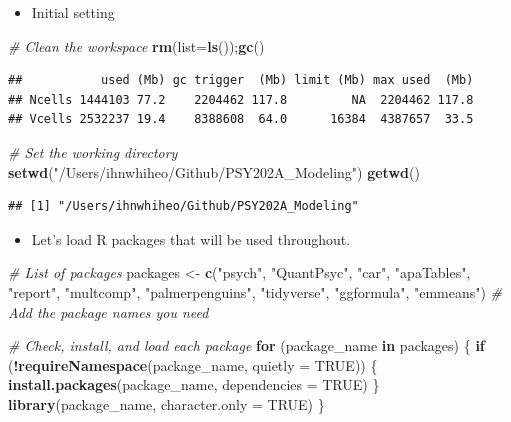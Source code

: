 \documentclass[
]{book}
\newenvironment{Shaded}{\begin{snugshade}}{\end{snugshade}}
\newcommand{\AttributeTok}[1]{\textcolor[rgb]{0.13,0.29,0.53}{#1}}
\newcommand{\CommentTok}[1]{\textcolor[rgb]{0.56,0.35,0.01}{\textit{#1}}}
\newcommand{\ConstantTok}[1]{\textcolor[rgb]{0.56,0.35,0.01}{#1}}
\newcommand{\ControlFlowTok}[1]{\textcolor[rgb]{0.13,0.29,0.53}{\textbf{#1}}}
\newcommand{\FunctionTok}[1]{\textcolor[rgb]{0.13,0.29,0.53}{\textbf{#1}}}
\newcommand{\NormalTok}[1]{#1}
\newcommand{\OtherTok}[1]{\textcolor[rgb]{0.56,0.35,0.01}{#1}}
\newcommand{\SpecialCharTok}[1]{\textcolor[rgb]{0.81,0.36,0.00}{\textbf{#1}}}
\newcommand{\StringTok}[1]{\textcolor[rgb]{0.31,0.60,0.02}{#1}}
\providecommand{\tightlist}{%
  \setlength{\itemsep}{0pt}\setlength{\parskip}{0pt}}
\begin{document}
\begin{itemize}
\tightlist
\item
  Initial setting
\end{itemize}

\begin{Shaded}
\begin{Highlighting}[]
\CommentTok{\# Clean the workspace}
\FunctionTok{rm}\NormalTok{(}\AttributeTok{list=}\FunctionTok{ls}\NormalTok{());}\FunctionTok{gc}\NormalTok{()}
\end{Highlighting}
\end{Shaded}

\begin{verbatim}
##           used (Mb) gc trigger  (Mb) limit (Mb) max used  (Mb)
## Ncells 1444103 77.2    2204462 117.8         NA  2204462 117.8
## Vcells 2532237 19.4    8388608  64.0      16384  4387657  33.5
\end{verbatim}

\begin{Shaded}
\begin{Highlighting}[]
\CommentTok{\# Set the working directory}
\FunctionTok{setwd}\NormalTok{(}\StringTok{"/Users/ihnwhiheo/Github/PSY202A\_Modeling"}\NormalTok{)}
\FunctionTok{getwd}\NormalTok{()}
\end{Highlighting}
\end{Shaded}

\begin{verbatim}
## [1] "/Users/ihnwhiheo/Github/PSY202A_Modeling"
\end{verbatim}

\begin{itemize}
\tightlist
\item
  Let's load R packages that will be used throughout.
\end{itemize}

\begin{Shaded}
\begin{Highlighting}[]
\CommentTok{\# List of packages}
\NormalTok{packages }\OtherTok{\textless{}{-}} \FunctionTok{c}\NormalTok{(}\StringTok{"psych"}\NormalTok{, }\StringTok{"QuantPsyc"}\NormalTok{, }\StringTok{"car"}\NormalTok{, }\StringTok{"apaTables"}\NormalTok{, }\StringTok{"report"}\NormalTok{, }\StringTok{"multcomp"}\NormalTok{,}
              \StringTok{"palmerpenguins"}\NormalTok{, }\StringTok{"tidyverse"}\NormalTok{, }\StringTok{"ggformula"}\NormalTok{, }\StringTok{"emmeans"}\NormalTok{) }\CommentTok{\# Add the package names you need}

\CommentTok{\# Check, install, and load each package}
\ControlFlowTok{for}\NormalTok{ (package\_name }\ControlFlowTok{in}\NormalTok{ packages) \{}
  \ControlFlowTok{if}\NormalTok{ (}\SpecialCharTok{!}\FunctionTok{requireNamespace}\NormalTok{(package\_name, }\AttributeTok{quietly =} \ConstantTok{TRUE}\NormalTok{)) \{}
    \FunctionTok{install.packages}\NormalTok{(package\_name, }\AttributeTok{dependencies =} \ConstantTok{TRUE}\NormalTok{)}
\NormalTok{  \}}
  \FunctionTok{library}\NormalTok{(package\_name, }\AttributeTok{character.only =} \ConstantTok{TRUE}\NormalTok{)}
\NormalTok{\}}
\end{Highlighting}
\end{Shaded}
\end{document}
